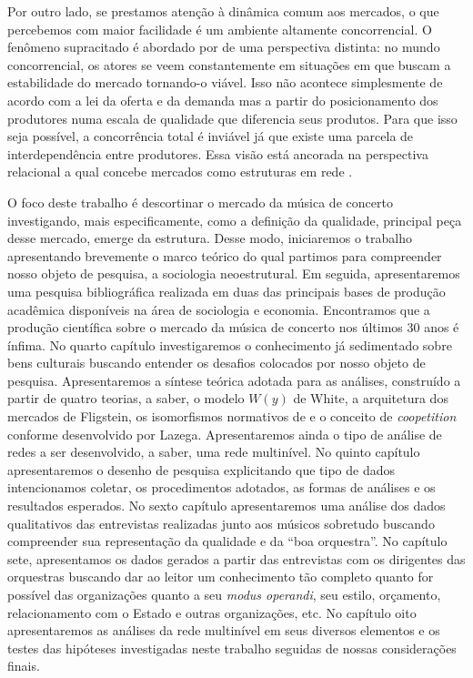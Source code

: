 \documentclass[a4paper, 12pt, openright, oneside, german, french, english, brazil]{abntex2}
\begin{document}
	Por outro lado, se prestamos atenção à dinâmica comum aos mercados, o que percebemos com maior facilidade é um ambiente altamente concorrencial. O fenômeno supracitado é abordado por  de uma perspectiva distinta: no mundo concorrencial, os atores se veem constantemente em situações em que buscam a estabilidade do mercado tornando-o viável. Isso não acontece simplesmente de acordo com a lei da oferta e da demanda mas a partir do posicionamento dos produtores numa escala de qualidade que diferencia seus produtos. Para que isso seja possível, a concorrência total é inviável já que existe uma parcela de interdependência entre produtores. Essa visão está ancorada na perspectiva relacional a qual concebe mercados como estruturas em rede \cite{white2008,white2002markets,lazega2014redes}.


	O foco deste trabalho é descortinar o mercado da música de concerto investigando, mais especificamente, como a definição da qualidade, principal peça desse mercado, emerge da estrutura. Desse modo, iniciaremos o trabalho apresentando brevemente o marco teórico do qual partimos para compreender nosso objeto de pesquisa, a sociologia neoestrutural. Em seguida, apresentaremos uma pesquisa bibliográfica realizada em duas das principais bases de produção acadêmica disponíveis na área de sociologia e economia. Encontramos que a produção científica sobre o mercado da música de concerto nos últimos 30 anos é ínfima. No quarto capítulo investigaremos o conhecimento já sedimentado sobre bens culturais buscando entender os desafios colocados por nosso objeto de pesquisa. Apresentaremos a síntese teórica adotada para as análises, construído a partir de quatro teorias, a saber, o modelo $W(y)$ de White, a arquitetura dos mercados de Fligstein, os isomorfismos normativos de  e o conceito de \textit{coopetition} conforme desenvolvido por Lazega. Apresentaremos ainda o tipo de análise de redes a ser desenvolvido, a saber, uma rede multinível. No quinto capítulo apresentaremos o desenho de pesquisa explicitando que tipo de dados intencionamos coletar, os procedimentos adotados, as formas de análises e os resultados esperados. No sexto capítulo apresentaremos uma análise dos dados qualitativos das entrevistas realizadas junto aos músicos sobretudo buscando compreender sua representação da qualidade e da ``boa orquestra''. No capítulo sete, apresentamos os dados gerados a partir das entrevistas com os dirigentes das orquestras buscando dar ao leitor um conhecimento tão completo quanto for possível das organizações quanto a seu \textit{modus operandi}, seu estilo, orçamento, relacionamento com o Estado e outras organizações, etc. No capítulo oito apresentaremos as análises da rede multinível em seus diversos elementos e os testes das hipóteses investigadas neste trabalho seguidas de nossas considerações finais.
\end{document}
